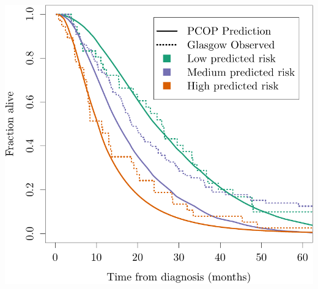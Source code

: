 \documentclass{article}\usepackage[]{graphicx}\usepackage[]{color}
\makeatletter
\def\maxwidth{ %
  \ifdim\Gin@nat@width>\linewidth
    \linewidth
  \else
    \Gin@nat@width
  \fi
}
\newenvironment{knitrout}{}{} %
\makeatother
\begin{document}
\begin{knitrout}
{\centering \includegraphics[width=\maxwidth]{figure/07-altman-4-glasgow-2} 

}



\end{knitrout}
\end{document}
